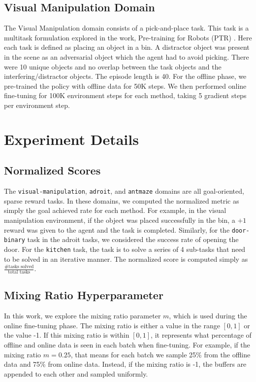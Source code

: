 \subsection{Visual Manipulation Domain} 
The Visual Manipulation domain consists of a pick-and-place task. This task is a multitask formulation explored in the work, Pre-training for Robots (PTR) \cite{2022arXiv221005178K}. Here each task is defined as placing an object in a bin. A distractor object was present in the scene as an adversarial object which the agent had to avoid picking. There were 10 unique objects and no overlap between the task objects and the interfering/distractor objects. The episode length is 40. For the offline phase, we pre-trained the policy with offline data for 50K steps. We then performed online fine-tuning for 100K environment steps for each method, taking 5 gradient steps per environment step.

\section{Experiment Details}
\label{app:hyperparam}

\subsection{Normalized Scores}
\label{appendix:normalized_score}

The \texttt{visual-manipulation}, \texttt{adroit}, and \texttt{antmaze} domains are all goal-oriented, sparse reward tasks. In these domains, we computed the normalized metric as simply the goal achieved rate for each method. For example, in the visual manipulation environment, if the object was placed successfully in the bin, a $+1$ reward was given to the agent and the task is completed. Similarly, for the \texttt{door-binary} task in the adroit tasks, we considered the success rate of opening the door. For the \texttt{kitchen} task, the task is to solve a series of 4 sub-tasks that need to be solved in an iterative manner. The normalized score is computed simply as $\frac{\# \text{tasks solved}}{\text{total tasks}}$.

\subsection{Mixing Ratio Hyperparameter}
\label{appendix:mixing_ratio_overview}
In this work, we explore the mixing ratio parameter $m$, which is used during the online fine-tuning phase. The mixing ratio is either a value in the range $\left[0, 1\right]$ or the value -1. If this mixing ratio is within $\left[0, 1\right]$, it represents what percentage of offline and online data is seen in each batch when fine-tuning. For example, if the mixing ratio $m=0.25$, that means for each batch we sample 25\% from the offline data and 75\% from online data. Instead, if the mixing ratio is -1, the buffers are appended to each other and sampled uniformly.

